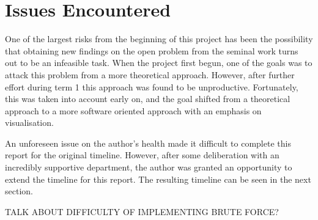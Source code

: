 \section{Issues Encountered}

One of the largest risks from the beginning of this project has been the possibility that obtaining new findings on the open problem from the seminal work \cite{chistikov2020re} turns out to be an infeasible task. When the project first begun, one of the goals was to attack this problem from a more theoretical approach. However, after further effort during term 1 this approach was found to be unproductive. 
Fortunately, this was taken into account early on, and the goal shifted from a theoretical approach to a more software oriented approach with an emphasis on visualisation.

An unforeseen issue on the author's health made it difficult to complete this report for the original timeline. However, after some deliberation with an incredibly supportive department, the author was granted an opportunity to extend the timeline for this report. The resulting timeline can be seen in the next section.

TALK ABOUT DIFFICULTY OF IMPLEMENTING BRUTE FORCE?